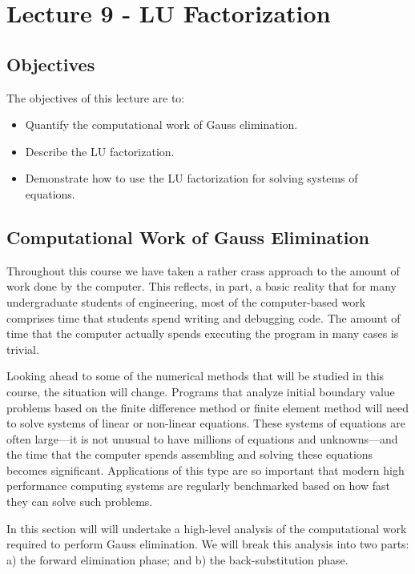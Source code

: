 \chapter{Lecture 9 - LU Factorization}
\label{ch:lec9n}
\section{Objectives}
The objectives of this lecture are to:
\begin{itemize}
\item Quantify the computational work of Gauss elimination.
\item Describe the LU factorization.
\item Demonstrate how to use the LU factorization for solving systems of equations.
\end{itemize}
\setcounter{lstannotation}{0}

\section{Computational Work of Gauss Elimination}

Throughout this course we have taken a rather crass approach to the amount of work done by the computer.  This reflects, in part, a basic reality that for many undergraduate students of engineering, most of the computer-based work comprises time that students spend writing and debugging code.  The amount of time that the computer actually spends executing the program in many cases is trivial.  

Looking ahead to some of the numerical methods that will be studied in this course, the situation will change.  Programs that analyze initial boundary value problems based on the finite difference method or finite element method will need to solve systems of linear or non-linear equations.  These systems of equations are often large---it is not unusual to have millions of equations and unknowns---and the time that the computer spends assembling and solving these equations becomes significant.  Applications of this type are so important that modern high performance computing systems are regularly benchmarked based on how fast they can solve such problems.\cite{HPL,top500}     

In this section will will undertake a high-level analysis of the computational work required to perform Gauss elimination.  We will break this analysis into two parts: a) the forward elimination phase; and b) the back-substitution phase.

